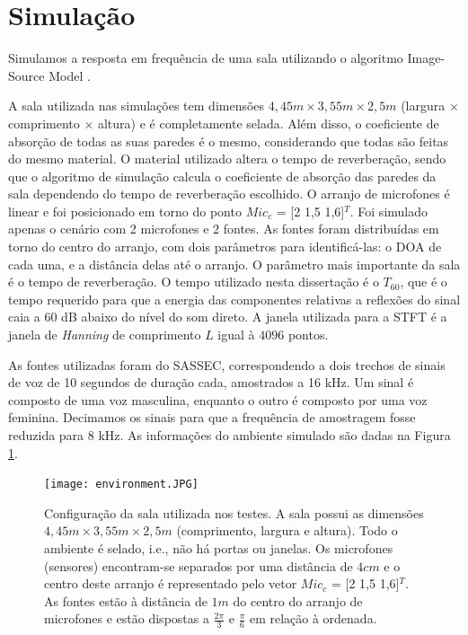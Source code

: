 \label{chap:4}
\section{Simulação}\label{sec:simulation}

Simulamos a resposta em frequência de uma sala utilizando o algoritmo Image-Source Model \cite{simulation}.

A sala utilizada nas simulações tem dimensões $4,45m \times 3,55m \times 2,5m$ (largura × comprimento × altura) e é completamente selada. Além disso, o coeficiente de absorção de todas as suas paredes é o mesmo, considerando que todas são feitas do mesmo material. O material utilizado altera o tempo de reverberação, sendo que o algoritmo de simulação calcula o coeficiente de absorção das paredes da sala dependendo do tempo de reverberação escolhido. O arranjo de microfones é linear e foi posicionado em torno do ponto $Mic_c$ = [2 1,5 1,6]$^T$. Foi simulado apenas o cenário com 2 microfones e 2 fontes. As fontes foram distribuídas em torno do centro do arranjo, com dois parâmetros para identificá-las: o DOA de cada uma, e a distância delas até o arranjo. O parâmetro mais importante da sala é o tempo de reverberação. O tempo utilizado nesta dissertação é o ${T_{60}}$, que é o tempo requerido para que a energia das componentes relativas a reflexões do sinal caia a 60 dB abaixo do nível do som direto. A janela utilizada para a STFT é a janela de \textit{Hanning} de comprimento $L$ igual à $4096$ pontos.

As fontes utilizadas foram do SASSEC, correspondendo a dois trechos de sinais de voz de 10 segundos de duração cada, amostrados a 16 kHz. Um sinal é composto de uma voz masculina, enquanto o outro é composto por uma voz feminina. Decimamos os sinais para que a frequência de amostragem fosse reduzida para 8 kHz. As informações do ambiente simulado são dadas na Figura \ref{fig:environment}.

\begin{figure}
    \centering
    \texttt{[image: environment.JPG]}
    \caption{Configuração da sala utilizada nos testes. A sala possui as dimensões $4,45m \times 3,55m \times 2,5m$ (comprimento, largura e altura). Todo o ambiente é selado, i.e., não há portas ou janelas. Os microfones (sensores) encontram-se separados por uma distância de $4cm$ e o centro deste arranjo é representado pelo vetor $Mic_c$ = [2 1,5 1,6]$^T$. As fontes estão à distância de $1m$ do centro do arranjo de microfones e estão dispostas a $\frac{2\pi}{3}$ e $\frac{\pi}{6}$ em relação à ordenada.}
    \label{fig:environment}
\end{figure}


